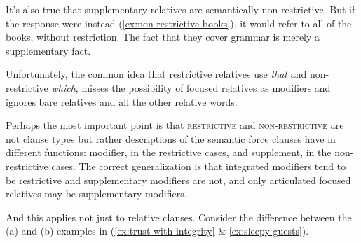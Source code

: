 It's also true that supplementary relatives are semantically non-restrictive. But if the response were instead (\ref{ex:non-restrictive-books}), it would refer to all of the books, without restriction. The fact that they cover grammar is merely a supplementary fact. 

\label{ex:non-restrictive-books}
\z

Unfortunately, the common idea that restrictive relatives use \textit{that} and non-restrictive \textit{which}, misses the possibility of focused relatives as modifiers and ignores bare relatives and all the other relative words.

\ea
{}
\z
\z
\ea
{}
\z
\z

Perhaps the most important point is that \textsc{restrictive} and \textsc{non-restrictive} are not clause types but rather descriptions of the semantic force clauses have in different functions: modifier, in the restrictive cases, and supplement, in the non-restrictive cases. The correct generalization is that integrated modifiers tend to be restrictive and supplementary modifiers are not, and only articulated focused relatives may be supplementary modifiers.

And this applies not just to relative clauses. Consider the difference between the (a) and (b) examples in  (\ref{ex:trust-with-integrity} \& \ref{ex:sleepy-guests}).

\ea \label{ex:trust-with-integrity}
    \z
\z
\ea \label{ex:sleepy-guests}
    \z
\z
{}


